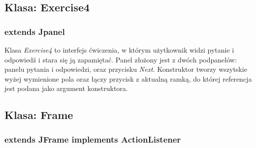 \documentclass[11pt]{article}
\begin{document}
\subsection{Klasa: Exercise4}
\subsubsection*{extends Jpanel}

Klasa \textit{Exercise4} to interfejs ćwiczenia, w którym użytkownik widzi pytanie i odpowiedź i stara się ją zapamiętać. Panel złożony jest z dwóch podpanelów: panelu pytania i odpowiedzi, oraz przycisku \textit{Next}. Konstruktor tworzy wszytskie wyżej wymienione pola oraz łączy przycisk z aktualną ramką, do której referencja jest podana jako argument konstruktora.

\subsection{Klasa: Frame}
\subsubsection*{extends JFrame implements ActionListener}
\end{document}

